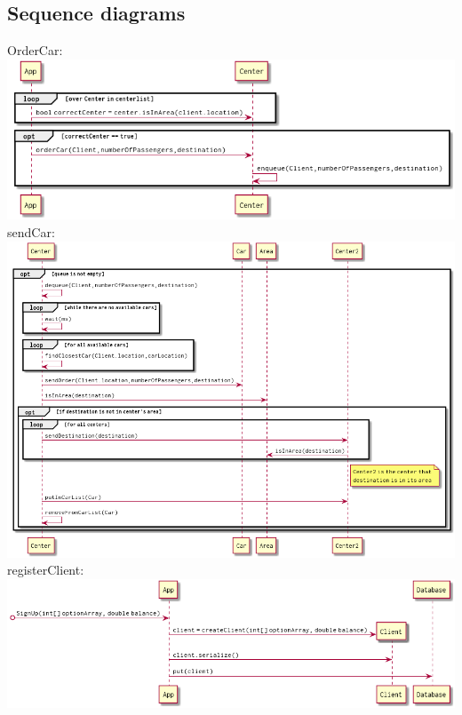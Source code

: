 \documentclass[a4paper]{article}
\begin{document}
\subsection*{Sequence diagrams}
OrderCar:\\
\includegraphics[width=1\textwidth]{../Diagrams/orderCar.png}\\
sendCar:\\
\includegraphics[width=1\textwidth]{../Diagrams/sendCar.png}\\
registerClient:\\
\includegraphics[width=1\textwidth]{../Diagrams/registerClient.png}
\end{document}
